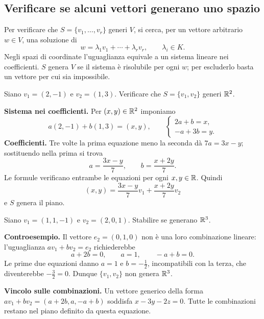 \subsection{Verificare se alcuni vettori generano uno spazio}

Per verificare che $S=\{v_1,\ldots,v_r\}$ generi $V$, si cerca, per un vettore arbitrario $w\in V$, una soluzione di
\[
  w=\lambda_1v_1+\cdots+\lambda_rv_r,\qquad \lambda_i\in K.
\]
Negli spazi di coordinate l'uguaglianza equivale a un sistema lineare nei coefficienti. $S$ genera $V$ se il sistema è risolubile per ogni $w$; per escluderlo basta un vettore per cui sia impossibile.

\begin{esercizio}
Siano $v_1=(2,-1)$ e $v_2=(1,3)$. Verificare che $S=\{v_1,v_2\}$ generi $\mathbb{R}^2$.
\end{esercizio}
\begin{svolgimento}
\textbf{Sistema nei coefficienti.} Per $(x,y)\in\mathbb{R}^2$ imponiamo
\[
  a(2,-1)+b(1,3)=(x,y),
  \qquad
  \begin{cases}
    2a+b=x,\\
    -a+3b=y.
  \end{cases}
\]
\textbf{Coefficienti.} Tre volte la prima equazione meno la seconda dà $7a=3x-y$; sostituendo nella prima si trova
\[
  a=\frac{3x-y}{7},\qquad b=\frac{x+2y}{7}.
\]
Le formule verificano entrambe le equazioni per ogni $x,y\in\mathbb{R}$. Quindi
\[
  (x,y)=\frac{3x-y}{7}v_1+\frac{x+2y}{7}v_2
\]
e $S$ genera il piano.
\end{svolgimento}

\begin{esercizio}[Generazione in $\R^3$]
Siano $v_1=(1,1,-1)$ e $v_2=(2,0,1)$. Stabilire se generano $\R^3$.
\end{esercizio}
\begin{svolgimento}
\textbf{Controesempio.} Il vettore $e_2=(0,1,0)$ non è una loro combinazione lineare: l'uguaglianza $av_1+bv_2=e_2$ richiederebbe
\[
  a+2b=0,\qquad a=1,\qquad -a+b=0.
\]
Le prime due equazioni danno $a=1$ e $b=-\tfrac12$, incompatibili con la terza, che diventerebbe $-\tfrac32=0$. Dunque $\{v_1,v_2\}$ non genera $\R^3$.

\textbf{Vincolo sulle combinazioni.} Un vettore generico della forma $av_1+bv_2=(a+2b,a,-a+b)$ soddisfa $x-3y-2z=0$. Tutte le combinazioni restano nel piano definito da questa equazione.
\end{svolgimento}

